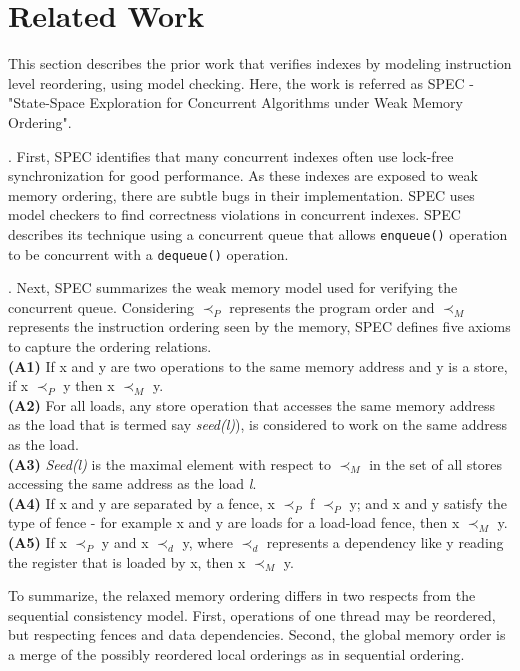 \section{Related Work}

This section describes the prior work that verifies indexes
by modeling instruction level reordering, using model checking.
Here, the work is referred as SPEC - "State-Space Exploration
for Concurrent Algorithms under Weak Memory Ordering".

. First, SPEC identifies that many concurrent indexes
often use lock-free synchronization for good performance. As
these indexes are exposed to weak memory ordering, there are
subtle bugs in their implementation. SPEC uses model checkers
to find correctness violations in concurrent indexes. SPEC
describes its technique using a concurrent queue that allows
\texttt{enqueue()} operation to be concurrent with a
\texttt{dequeue()} operation.

. Next, SPEC summarizes the weak
memory model used for verifying the concurrent queue. Considering
$\prec_{P}$ represents the program order and $\prec_{M}$ represents
the instruction ordering seen by the memory, SPEC defines five
axioms to capture the ordering relations.\\
\textbf{(A1)} If x and y are two operations to the same memory address
and y is a store, if x $\prec_{P}$ y then x $\prec_{M}$ y.
\\
\textbf{(A2)} For all loads, any store operation that accesses the
same memory address as the load that is termed say \emph{seed(l)}),
is considered to work on the same address as the load.
\\
\textbf{(A3)} \emph{Seed(l)} is the maximal element with respect
to $\prec_{M}$ in the set of all stores accessing the same address
as the load \emph{l}.
\\
\textbf{(A4)} If x and y are separated by a fence,
x $\prec_{P}$ f $\prec_{P}$ y; and x and y satisfy the type of
fence - for example x and y are loads for a load-load fence,
then x $\prec_{M}$ y.
\\
\textbf{(A5)} If x $\prec_{P}$ y and x $\prec_{d}$ y, where 
$\prec_{d}$ represents a dependency like y reading the register
that is loaded by x, then x $\prec_{M}$ y.

To summarize, the relaxed memory ordering differs in two respects
from the sequential consistency model. First, operations of one
thread may be reordered, but respecting fences and data dependencies.
Second, the global memory order is a merge of the possibly
reordered local orderings as in sequential ordering.

